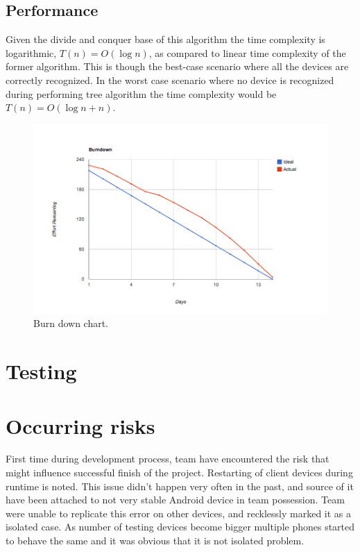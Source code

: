 \subsection{Performance}
Given the divide and conquer base of this algorithm the time complexity is logarithmic, $T(n) = O(\log n)$, as compared to linear time complexity of the former algorithm. This is though the best-case scenario where all the devices are correctly recognized. In the worst case scenario where no device is recognized during performing tree algorithm the time complexity would be $T(n) = O(\log n + n)$.

\begin{figure}[H]
	\centering
		\includegraphics[width=18cm]{sprint5/BurndownSprint5.png}
	\caption{Burn down chart.}
	\label{fig:Burn5 }
\end{figure}

\section{Testing}
\section{Occurring risks}
\label{sec:sprint5_occuring_risks}
First time during development process, team have encountered the risk that might influence successful finish of the project. 
Restarting of client devices during runtime is noted. This issue didn't happen very often in the past, and source of it have been attached to not very stable Android device in team possession. Team were unable to replicate this error on other devices, and recklessly marked it as a isolated case. As number of testing devices become bigger multiple phones started to behave the same and it was obvious that it is not isolated problem. 

